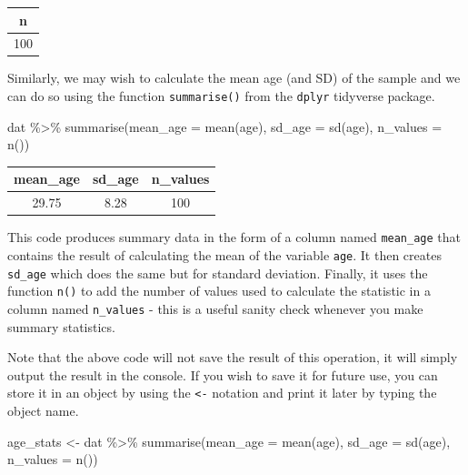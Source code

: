 \documentclass[
  english,
  doc,floatsintext]{apa6}
\newenvironment{Shaded}{\begin{snugshade}}{\end{snugshade}}
\newcommand{\AttributeTok}[1]{\textcolor[rgb]{0.77,0.63,0.00}{#1}}
\newcommand{\FunctionTok}[1]{\textcolor[rgb]{0.00,0.00,0.00}{#1}}
\newcommand{\NormalTok}[1]{#1}
\newcommand{\OtherTok}[1]{\textcolor[rgb]{0.56,0.35,0.01}{#1}}
\newcommand{\SpecialCharTok}[1]{\textcolor[rgb]{0.00,0.00,0.00}{#1}}
\begin{document}
\begin{tabular}{c}
\hline
n\\
\hline
100\\
\hline
\end{tabular}

Similarly, we may wish to calculate the mean age (and SD) of the sample and we can do so using the function \texttt{summarise()} from the \texttt{dplyr} tidyverse package.

\begin{Shaded}
\begin{Highlighting}[]
\NormalTok{dat }\SpecialCharTok{\%\textgreater{}\%}
  \FunctionTok{summarise}\NormalTok{(}\AttributeTok{mean\_age =} \FunctionTok{mean}\NormalTok{(age),}
            \AttributeTok{sd\_age =} \FunctionTok{sd}\NormalTok{(age),}
            \AttributeTok{n\_values =} \FunctionTok{n}\NormalTok{())}
\end{Highlighting}
\end{Shaded}

\begin{tabular}{c|c|c}
\hline
mean\_age & sd\_age & n\_values\\
\hline
29.75 & 8.28 & 100\\
\hline
\end{tabular}

This code produces summary data in the form of a column named \texttt{mean\_age} that contains the result of calculating the mean of the variable \texttt{age}. It then creates \texttt{sd\_age} which does the same but for standard deviation. Finally, it uses the function \texttt{n()} to add the number of values used to calculate the statistic in a column named \texttt{n\_values} - this is a useful sanity check whenever you make summary statistics.

Note that the above code will not save the result of this operation, it will simply output the result in the console. If you wish to save it for future use, you can store it in an object by using the \texttt{\textless{}-} notation and print it later by typing the object name.

\begin{Shaded}
\begin{Highlighting}[]
\NormalTok{age\_stats }\OtherTok{\textless{}{-}}\NormalTok{ dat }\SpecialCharTok{\%\textgreater{}\%}
  \FunctionTok{summarise}\NormalTok{(}\AttributeTok{mean\_age =} \FunctionTok{mean}\NormalTok{(age),}
            \AttributeTok{sd\_age =} \FunctionTok{sd}\NormalTok{(age),}
            \AttributeTok{n\_values =} \FunctionTok{n}\NormalTok{())}
\end{Highlighting}
\end{Shaded}
\end{document}

